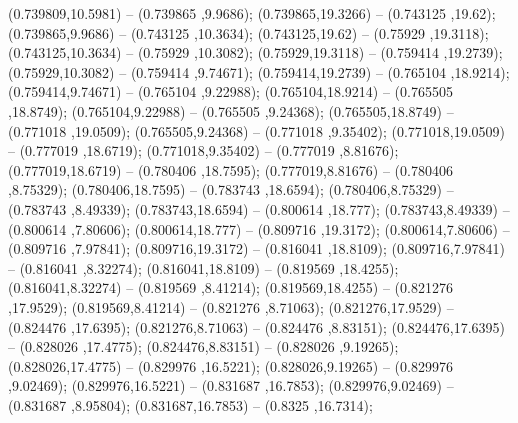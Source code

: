 (0.739809,10.5981) -- (0.739865 ,9.9686);
 (0.739865,19.3266) -- (0.743125 ,19.62);
 (0.739865,9.9686) -- (0.743125 ,10.3634);
 (0.743125,19.62) -- (0.75929 ,19.3118);
 (0.743125,10.3634) -- (0.75929 ,10.3082);
 (0.75929,19.3118) -- (0.759414 ,19.2739);
 (0.75929,10.3082) -- (0.759414 ,9.74671);
 (0.759414,19.2739) -- (0.765104 ,18.9214);
 (0.759414,9.74671) -- (0.765104 ,9.22988);
 (0.765104,18.9214) -- (0.765505 ,18.8749);
 (0.765104,9.22988) -- (0.765505 ,9.24368);
 (0.765505,18.8749) -- (0.771018 ,19.0509);
 (0.765505,9.24368) -- (0.771018 ,9.35402);
 (0.771018,19.0509) -- (0.777019 ,18.6719);
 (0.771018,9.35402) -- (0.777019 ,8.81676);
 (0.777019,18.6719) -- (0.780406 ,18.7595);
 (0.777019,8.81676) -- (0.780406 ,8.75329);
 (0.780406,18.7595) -- (0.783743 ,18.6594);
 (0.780406,8.75329) -- (0.783743 ,8.49339);
 (0.783743,18.6594) -- (0.800614 ,18.777);
 (0.783743,8.49339) -- (0.800614 ,7.80606);
 (0.800614,18.777) -- (0.809716 ,19.3172);
 (0.800614,7.80606) -- (0.809716 ,7.97841);
 (0.809716,19.3172) -- (0.816041 ,18.8109);
 (0.809716,7.97841) -- (0.816041 ,8.32274);
 (0.816041,18.8109) -- (0.819569 ,18.4255);
 (0.816041,8.32274) -- (0.819569 ,8.41214);
 (0.819569,18.4255) -- (0.821276 ,17.9529);
 (0.819569,8.41214) -- (0.821276 ,8.71063);
 (0.821276,17.9529) -- (0.824476 ,17.6395);
 (0.821276,8.71063) -- (0.824476 ,8.83151);
 (0.824476,17.6395) -- (0.828026 ,17.4775);
 (0.824476,8.83151) -- (0.828026 ,9.19265);
 (0.828026,17.4775) -- (0.829976 ,16.5221);
 (0.828026,9.19265) -- (0.829976 ,9.02469);
 (0.829976,16.5221) -- (0.831687 ,16.7853);
 (0.829976,9.02469) -- (0.831687 ,8.95804);
 (0.831687,16.7853) -- (0.8325 ,16.7314);
